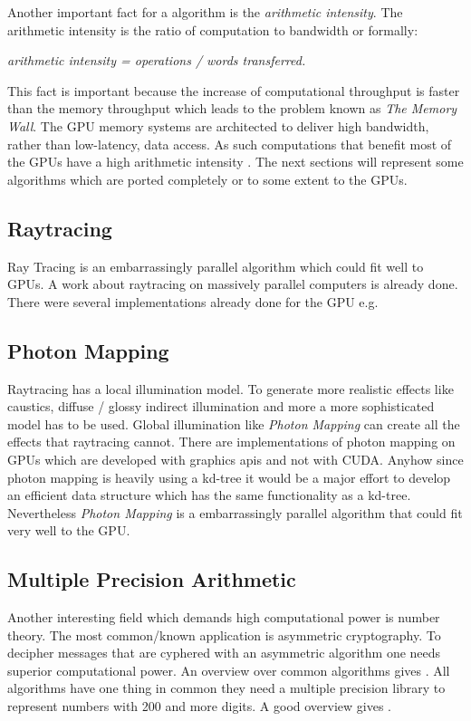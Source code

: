 Another important fact for a algorithm is the \emph{arithmetic intensity}. The
arithmetic intensity is the ratio of computation to bandwidth or formally:
\begin{center} 
 \emph{arithmetic intensity = operations / words transferred.}
\end{center}
This fact is important because the increase of computational throughput is
faster than the memory throughput which leads to the problem known as \emph{The
Memory Wall}. The \gls{GPU} memory systems are architected to deliver high bandwidth,
rather than low-latency, data access. As such computations that benefit most of
the \glspl{GPU} have a high arithmetic intensity \citep{citeulike:3733428}. The next 
sections will represent some algorithms which are ported completely or to some 
extent to the \glspl{GPU}.

\subsection{Raytracing} %
\label{par:ray_tracing}
Ray Tracing \citep{citeulike:841961} is an embarrassingly parallel algorithm which
could fit well to \glspl{GPU}. A work about raytracing on
massively parallel computers \citep{citeulike:80546} is already done. 
There were several implementations already done for the GPU e.g. 

\subsection{Photon Mapping} %
\label{par:photon_mapping}
Raytracing has a local illumination model. To generate more realistic effects
like caustics, diffuse / glossy indirect illumination and more a more
sophisticated model has to be used. Global illumination like \emph{Photon
Mapping} \citep{citeulike:635695} can create all the effects that raytracing
cannot. There are implementations of photon mapping on GPUs
\citep{Purcell:2003:PMO} which are developed with graphics apis and not with
\gls{CUDA}. Anyhow since photon mapping is heavily using a kd-tree it would be a major
effort to develop an efficient data structure which has the same functionality
as a kd-tree. Nevertheless \emph{Photon Mapping} is a embarrassingly parallel 
algorithm that could fit very well to the \gls{GPU}.


\subsection{Multiple Precision Arithmetic} %
\label{par:multiple_precision_arithmetic}
Another interesting field which demands high computational power is number
theory. The most common/known application is asymmetric cryptography. To
decipher messages that are cyphered with an asymmetric algorithm one needs
superior computational power. An overview over common algorithms gives
\citep{citeulike:3783254}. All algorithms have one thing in common they need a
multiple precision library to represent numbers with 200 and more digits. A good
overview gives \citep{citeulike:3783244}.

